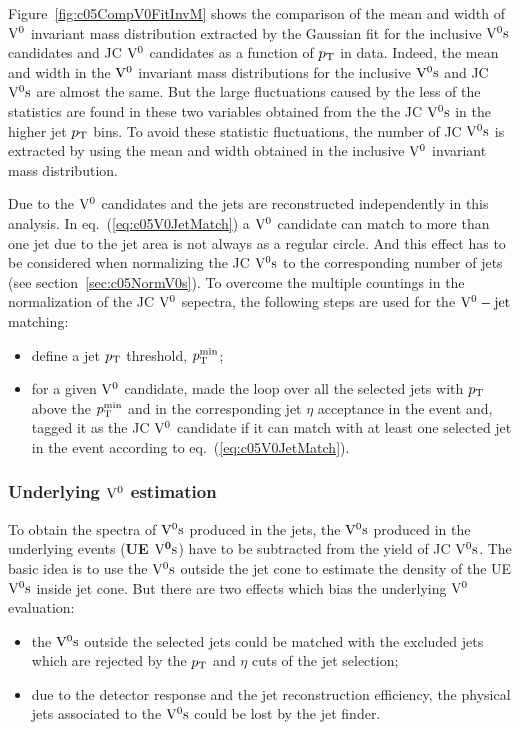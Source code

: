Figure~\ref{fig:c05CompV0FitInvM} shows the comparison of the mean and width
of ${\rm V}^{0}$ invariant mass distribution extracted by the Gaussian fit
for the inclusive ${\rm V}^{0}{\rm s}$ candidates and JC ${\rm V}^{0}$ candidates
as a function of $p_{\rm T}$ in data.
Indeed, the mean and width in the ${\rm V}^{0}$ invariant mass distributions
for the inclusive ${\rm V}^{0}{\rm s}$ and JC ${\rm V}^{0}{\rm s}$ are almost the same.
But the large fluctuations caused by the less of the statistics are found
in these two variables obtained from the the JC ${\rm V}^{0}{\rm s}$ in the higher
jet $p_{\rm T}$ bins.
To avoid these statistic fluctuations,
the number of JC ${\rm V}^{0}{\rm s}$ is extracted by using the mean and width
obtained in the inclusive ${\rm V}^{0}$ invariant mass distribution.

Due to the ${\rm V}^{0}$ candidates and the jets are reconstructed independently
in this analysis.
In eq.~(\ref{eq:c05V0JetMatch}) a ${\rm V}^{0}$ candidate can match to
more than one jet due to the jet area is not always as a regular circle.
And this effect has to be considered when normalizing the JC
${\rm V}^{0}{\rm s}$ to the corresponding number of
jets (see section~\ref{sec:c05NormV0s}).
To overcome the multiple countings in the normalization of
the JC ${\rm V}^{0}$ sepectra,
the following steps are used for the ${\rm V}^{0}-{\rm jet}$ matching:
\begin{itemize}
\item define a jet $p_{\rm T}$ threshold, $p_{\rm T}^{\min}$;
\item for a given ${\rm V}^{0}$ candidate,
      made the loop over all the selected jets with $p_{\rm T}$ above
      the $p_{\rm T}^{\min}$ and in the corresponding jet $\eta$ acceptance
      in the event and,
      tagged it as the JC ${\rm V}^{0}$ candidate if it can match with at least
      one selected jet in the event according to eq.~(\ref{eq:c05V0JetMatch}).
\end{itemize}

\subsubsection{Underlying ${\rm V}^{0}$ estimation}
\label{sec:c05EstiV0sUE}

To obtain the spectra of ${\rm V}^{0}{\rm s}$ produced in the jets,
the ${\rm V}^{0}{\rm s}$ produced in the underlying events ({\bf UE $\mathbf{{\rm V}^{0}{\rm s}}$})
have to be subtracted from the yield of JC ${\rm V}^{0}{\rm s}$.
The basic idea is to use the ${\rm V}^{0}{\rm s}$ outside the jet cone to estimate
the density of the UE ${\rm V}^{0}{\rm s}$ inside jet cone.
But there are two effects which bias the underlying ${\rm V}^{0}$ evaluation:
\begin{itemize}
\item the ${\rm V}^{0}{\rm s}$ outside the selected jets could be
      matched with the excluded jets which are rejected by
      the $p_{\rm T}$ and $\eta$ cuts of the jet selection;
\item due to the detector response and the jet reconstruction efficiency,
      the physical jets associated to the ${\rm V}^{0}{\rm s}$ could be lost by the
      jet finder.
\end{itemize}

